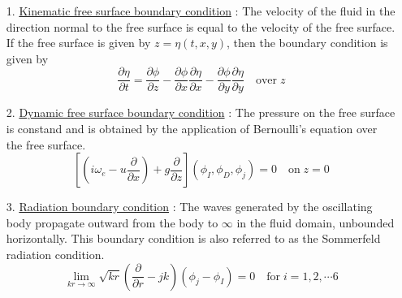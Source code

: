 \begin{itemize}
    \item[1.] \underline{Kinematic free surface boundary condition} : 
    The velocity of the fluid in the direction normal to the free surface is equal to the velocity of the free surface. If the free surface is given by $z = \eta(t, x, y)$, then the boundary condition is given by
    \begin{equation}
        \label{eq:kin_free_surface_cond}
        \frac{\partial \eta}{\partial t} = \frac{\partial \phi}{\partial z} - \frac{\partial \phi}{\partial x} \frac{\partial \eta}{\partial x} - \frac{\partial \phi}{\partial y}\frac{\partial \eta}{\partial y} \quad \text{over} \; z
    \end{equation}
    
    \item[2.] \underline{Dynamic free surface boundary condition} : 
    The pressure on the free surface is constand and is obtained by the application of Bernoulli's 
    equation over the free surface.
    \begin{equation}
        \label{eq:dyn_free_surface_cond}
        \left[\left(i\omega_e - u\frac{\partial}{\partial x}\right) + g\frac{\partial}{\partial z}\right](\phi_I, \phi_D, \phi_j) = 0 \quad \text{on} \; z = 0
    \end{equation}
    
    \item[3.] \underline{Radiation boundary condition} :
    The waves generated by the oscillating body propagate outward from the body to $\infty$ in the fluid domain, unbounded horizontally. This boundary condition is also referred to as the Sommerfeld radiation condition.
    \begin{equation}
        \label{eq:sommerfel_rad_cond}
        \lim_{kr\rightarrow \infty}\sqrt{kr}\left(\frac{\partial}{\partial r} -jk\right)(\phi_j - \phi_I) = 0 \quad \text{for}\; i = 1, 2, \cdots 6
    \end{equation}
    

\end{itemize}
